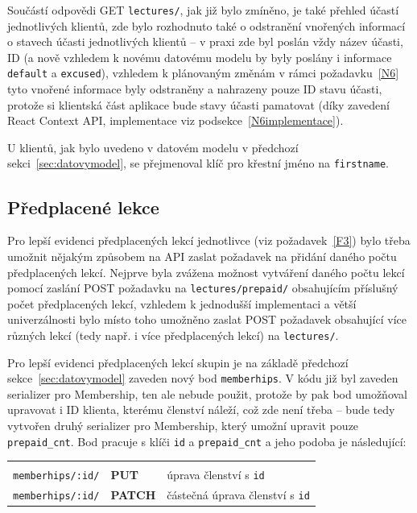Součástí odpovědi GET \verb|lectures/|, jak již bylo zmíněno, je také přehled účastí jednotlivých klientů, zde bylo rozhodnuto také o odstranění vnořených informací o stavech účasti jednotlivých klientů -- v praxi zde byl poslán vždy název účasti, ID (a nově vzhledem k novému datovému modelu by byly poslány i informace \verb|default| a \verb|excused|), vzhledem k plánovaným změnám v rámci požadavku~\ref{N6} tyto vnořené informace byly odstraněny a nahrazeny pouze ID stavu účasti, protože si klientská část aplikace bude stavy účasti pamatovat (díky zavedení React Context API, implementace viz podsekce~\ref{N6implementace}).

U klientů, jak bylo uvedeno v datovém modelu v předchozí sekci~\ref{sec:datovymodel}, se přejmenoval klíč pro křestní jméno na \verb|firstname|.
    
\newcommand{\apiA}{0.33}
\newcommand{\apiB}{0.14}
\newcommand{\apiC}{0.43}

\subsection{Předplacené lekce}

Pro lepší evidenci předplacených lekcí jednotlivce (viz požadavek~\ref{F3}) bylo třeba umožnit nějakým způsobem na API zaslat požadavek na přidání daného počtu předplacených lekcí. Nejprve byla zvážena možnost vytváření daného počtu lekcí pomocí zaslání POST požadavku na \verb|lectures/prepaid/| obsahujícím příslušný počet předplacených lekcí, vzhledem k jednodušší implementaci a větší univerzálnosti bylo místo toho umožněno zaslat POST požadavek obsahující více různých lekcí (tedy např. i více předplacených lekcí) na \verb|lectures/|.

Pro lepší evidenci předplacených lekcí skupin je na základě předchozí sekce~\ref{sec:datovymodel} zaveden nový bod \verb|memberhips|. V kódu již byl zaveden serializer pro Membership, ten ale nebude použit, protože by pak bod umožňoval upravovat i ID klienta, kterému členství náleží, což zde není třeba -- bude tedy vytvořen druhý serializer pro Membership, který umožní upravit pouze \verb|prepaid_cnt|. Bod pracuje s klíči \verb|id| a \verb|prepaid_cnt| a jeho podoba je následující:

{\centering
\begin{tabular}{p{\apiA\textwidth} p{\apiB\textwidth} p{\apiC\textwidth}}&&\\
    \verb|memberhips/:id/|     & \textbf{PUT}      & úprava členství s \verb|id|\\
    \verb|memberhips/:id/|     & \textbf{PATCH}    & částečná úprava členství s \verb|id|\\
\end{tabular}}

